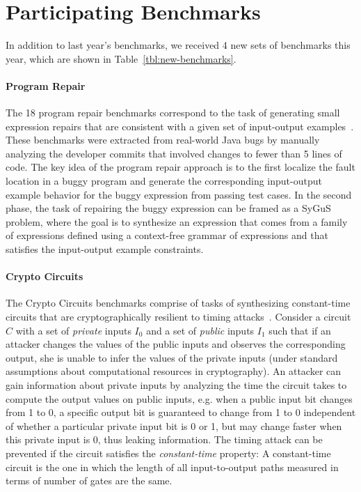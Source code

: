 

\section{Participating Benchmarks}
\label{sec:benchs}
In addition to last year's benchmarks, we received 4 new sets of benchmarks this year, which are shown in Table~\ref{tbl:new-benchmarks}. 


\paragraph{Program Repair}
The 18 program repair benchmarks correspond to the task of generating small expression repairs that are consistent with a given set of input-output examples~\cite{repairbenchmarks}. These benchmarks were extracted from real-world Java bugs by manually analyzing the developer commits that involved changes to fewer than 5 lines of code. The key idea of the program repair approach is to the first localize the fault location in a buggy program and generate the corresponding input-output example behavior for the buggy expression from passing test cases. In the second phase, the task of repairing the buggy expression can be framed as a SyGuS problem, where the goal is to synthesize an expression that comes from a family of expressions defined using a context-free grammar of expressions and that satisfies the input-output example constraints.

\paragraph{Crypto Circuits}
The Crypto Circuits benchmarks comprise of tasks of synthesizing constant-time circuits that are cryptographically resilient to timing attacks~\cite{EldibWW16}. Consider a circuit $C$ with a set of \emph{private} inputs $I_0$ and a set of \emph{public} inputs $I_1$ such that if an attacker changes the values of
the public inputs and observes the corresponding output, she is unable to infer the values
of the private inputs (under standard assumptions about computational resources in cryptography). An attacker can gain information about private inputs by analyzing the time the circuit takes to compute the output values on public inputs, e.g. when a public input bit changes from 1 to 0, a specific output bit is guaranteed to
change from 1 to 0 independent of whether a particular private input bit is 0 or 1, but 
may change faster when this private input is 0, thus leaking information.
The timing attack can be prevented if the circuit satisfies the \emph{constant-time} property:
A constant-time circuit is the one in which the length of all input-to-output paths  measured in terms of number of gates
are the same.

